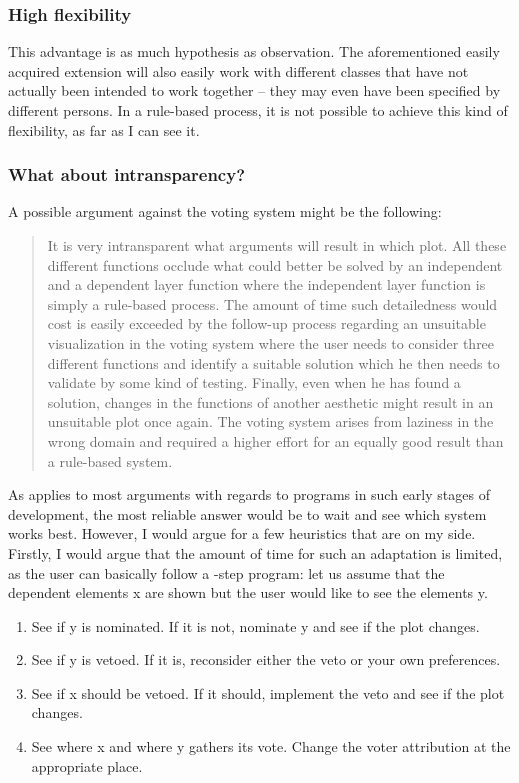 \documentclass[]{report}
\providecommand{\tightlist}{%
  \setlength{\itemsep}{0pt}\setlength{\parskip}{0pt}}
\theoremstyle{definition}
\theoremstyle{definition}
\theoremstyle{definition}
\theoremstyle{remark}
\begin{document}
\subsubsection{High flexibility}\label{high-flexibility}

This advantage is as much hypothesis as observation. The aforementioned
easily acquired extension will also easily work with different classes
that have not actually been intended to work together -- they may even
have been specified by different persons. In a rule-based process, it is
not possible to achieve this kind of flexibility, as far as I can see
it.

\subsubsection{What about
intransparency?}\label{what-about-intransparency}

A possible argument against the voting system might be the following:

\begin{quote}
It is very intransparent what arguments will result in which plot. All
these different functions occlude what could better be solved by an
independent and a dependent layer function where the independent layer
function is simply a rule-based process. The amount of time such
detailedness would cost is easily exceeded by the follow-up process
regarding an unsuitable visualization in the voting system where the
user needs to consider three different functions and identify a suitable
solution which he then needs to validate by some kind of testing.
Finally, even when he has found a solution, changes in the functions of
another aesthetic might result in an unsuitable plot once again. The
voting system arises from laziness in the wrong domain and required a
higher effort for an equally good result than a rule-based system.
\end{quote}

As applies to most arguments with regards to programs in such early
stages of development, the most reliable answer would be to wait and see
which system works best. However, I would argue for a few heuristics
that are on my side. Firstly, I would argue that the amount of time for
such an adaptation is limited, as the user can basically follow a -step
program: let us assume that the dependent elements x are shown but the
user would like to see the elements y.

\begin{enumerate}
\def\labelenumi{\arabic{enumi}.}
\tightlist
\item
  See if y is nominated. If it is not, nominate y and see if the plot
  changes.
\item
  See if y is vetoed. If it is, reconsider either the veto or your own
  preferences.
\item
  See if x should be vetoed. If it should, implement the veto and see if
  the plot changes.
\item
  See where x and where y gathers its vote. Change the voter attribution
  at the appropriate place.
\end{enumerate}
\end{document}
